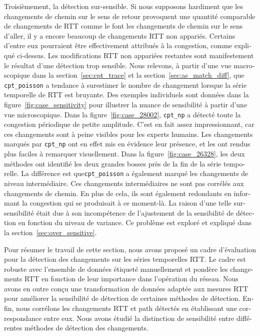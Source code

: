 \begin{otherlanguage}{french}
Troisièmement, la détection sur-sensible.
Si nous supposons hardiment que les changements de chemin sur le sens de retour provoquent 
une quantité comparable de changements de RTT comme le font les changements de chemin sur le sens d'aller, 
il y a encore beaucoup de changements RTT non appariés.
Certains d'entre eux pourraient être effectivement attribués à la congestion, comme expliqué ci-dessus.
Les modifications RTT non appariées restantes sont manifestement le résultat d'une détection trop sensible.
Nous relevons,  à partir d'une vue macroscopique dans la section~\ref{sec:cpt_trace} et la section~\ref {sec:as_match_diff}, 
que \texttt{cpt\_poisson} a tendance à surestimer le nombre de changement lorsque la série temporelle de RTT est bruyante.
Des exemples individuels sont données dans la figure~\ref{fig:case_sensitivity} pour illustrer 
la nuance de sensibilité à partir d'une vue microscopique.
Dans la figure~\ref{fig:case_28002}, \texttt{cpt\_np} a détecté toute la congestion périodique de petite amplitude.
C'est en fait assez impressionnant, car ces changements sont à peine visibles pour les experts humains.
Les changements marqués par \texttt{cpt\_np} ont en effet mis en évidence leur présence, 
et les ont rendus plus faciles à remarquer visuellement.
Dans la figure~\ref{fig:case_26328}, les deux méthodes ont identifié les deux grandes bosses près de la fin de la série temporelle.
La différence est que\texttt{cpt\_poisson} a également marqué les changements de niveau intermédiaire.
Ces changements intermédiaires ne sont pas corrélés aux changements de chemin.
En plus de cela, ils sont également redondants en informant la congestion qui se produisait à ce moment-là.
La raison d'une telle sur-sensibilité était due à son incompétence  de l'ajustement de la sensibilité de détection en fonction du niveau de variance. 
Ce problème est exploré et expliqué dans la section~\ref{sec:over_sensitive}.

Pour résumer le travail de cette section, nous avons proposé un cadre d'évaluation pour la détection des changements sur les séries temporelles RTT.
Le cadre est robuste avec l'ensemble de données étiqueté manuellement et pondère les changements RTT en fonction de leur importance dans l'opération du réseau.
Nous avons en outre conçu une transformation de données adaptée aux mesures RTT pour améliorer la sensibilité de détection de certaines méthodes de détection.
Enfin, nous corrélons les changements RTT et path détectés en établissant une correspondance entre eux.
Nous avons étudié la distinction de sensibilité entre différentes méthodes de détection des changements.


\end{otherlanguage}

